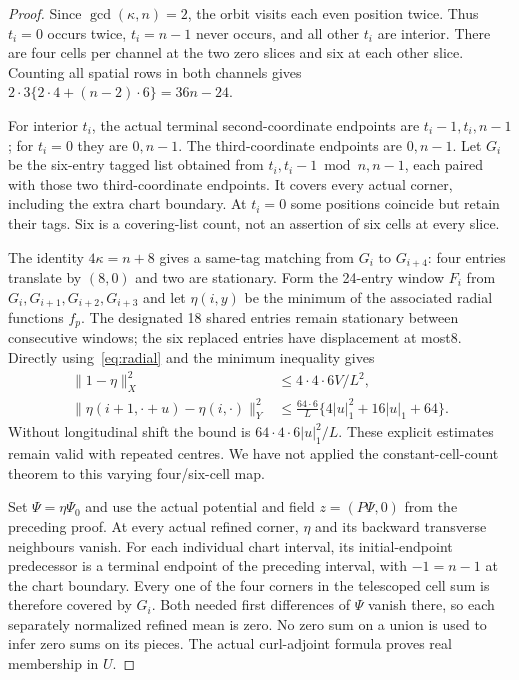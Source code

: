 \documentclass[11pt,a4paper]{article}
\newcommand{\norm}[1]{\lVert#1\rVert}
\begin{document}
\begin{proof}
Since $\gcd(\kappa,n)=2$, the orbit visits each even position twice.
Thus $t_i=0$ occurs twice, $t_i=n-1$ never occurs, and all other $t_i$ are
interior. There are four cells per channel at the two zero slices and six
at each other slice. Counting all spatial rows in both channels gives
$2\cdot3\{2\cdot4+(n-2)\cdot6\}=36n-24$.

For interior $t_i$, the actual terminal second-coordinate endpoints are
$t_i-1,t_i,n-1$; for $t_i=0$ they are $0,n-1$. The third-coordinate
endpoints are $0,n-1$. Let $G_i$ be the six-entry tagged list obtained
from $t_i,t_i-1\bmod n,n-1$, each paired with those two third-coordinate
endpoints. It covers every actual corner, including the extra chart
boundary. At $t_i=0$ some positions coincide but retain their tags.
Six is a covering-list count, not an assertion of six cells at every slice.

The identity $4\kappa=n+8$ gives a same-tag matching from $G_i$ to
$G_{i+4}$: four entries translate by $(8,0)$ and two are stationary.
Form the 24-entry window $F_i$ from $G_i,G_{i+1},G_{i+2},G_{i+3}$ and
let $\eta(i,y)$ be the minimum of the associated radial functions $f_p$.
The designated 18 shared entries remain stationary between consecutive
windows; the six replaced entries have displacement at most8. Directly
using~\eqref{eq:radial} and the minimum inequality gives
\begin{align*}
 \norm{1-\eta}_X^2&\leq4\cdot4\cdot6V/L^2,\\
 \norm{\eta(i+1,\cdot+u)-\eta(i,\cdot)}_Y^2
 &\leq\frac{64\cdot6}{L}
       \{4|u|_1^2+16|u|_1+64\}.
\end{align*}
Without longitudinal shift the bound is $64\cdot4\cdot6|u|_1^2/L$.
These explicit estimates remain valid with repeated centres. We have not
applied the constant-cell-count theorem to this varying four/six-cell map.

Set $\Psi=\eta\Psi_0$ and use the actual potential and field
$z=(P\Psi,0)$ from the preceding proof. At every actual refined corner,
$\eta$ and its backward transverse neighbours vanish. For each individual
chart interval, its initial-endpoint predecessor is a terminal endpoint of
the preceding interval, with $-1=n-1$ at the chart boundary. Every one of
the four corners in the telescoped cell sum is therefore covered by $G_i$.
Both needed first differences of $\Psi$ vanish there, so each separately
normalized refined mean is zero. No zero sum on a union is used to infer
zero sums on its pieces. The actual curl-adjoint formula proves real
membership in $U$.


\end{proof}
\end{document}
